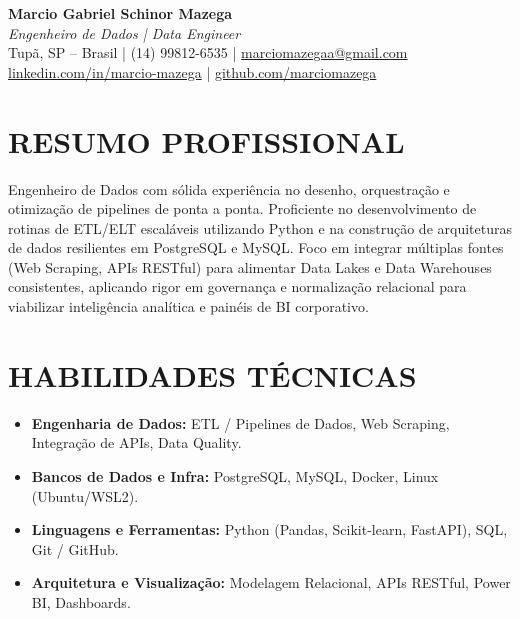 \documentclass[11pt,a4paper]{article}
\begin{document}
\pagestyle{empty}

{\centering
\textbf{\huge Marcio Gabriel Schinor Mazega} \\ \vspace{0.2cm}
\textit{\large Engenheiro de Dados | Data Engineer} \\ \vspace{0.1cm}
Tupã, SP -- Brasil | (14) 99812-6535 | \href{mailto:marciomazegaa@gmail.com}{marciomazegaa@gmail.com} \\
\href{https://linkedin.com/in/marcio-mazega}{linkedin.com/in/marcio-mazega} | \href{https://github.com/marciomazega}{github.com/marciomazega} \\
}

\vspace{0.4cm}
\section*{RESUMO PROFISSIONAL}
Engenheiro de Dados com sólida experiência no desenho, orquestração e otimização de pipelines de ponta a ponta. Proficiente no desenvolvimento de rotinas de ETL/ELT escaláveis utilizando Python e na construção de arquiteturas de dados resilientes em PostgreSQL e MySQL. Foco em integrar múltiplas fontes (Web Scraping, APIs RESTful) para alimentar Data Lakes e Data Warehouses consistentes, aplicando rigor em governança e normalização relacional para viabilizar inteligência analítica e painéis de BI corporativo.

\vspace{0.2cm}
\section*{HABILIDADES TÉCNICAS}
\begin{itemize}
    \item \textbf{Engenharia de Dados:} ETL / Pipelines de Dados, Web Scraping, Integração de APIs, Data Quality.
    \item \textbf{Bancos de Dados e Infra:} PostgreSQL, MySQL, Docker, Linux (Ubuntu/WSL2).
    \item \textbf{Linguagens e Ferramentas:} Python (Pandas, Scikit-learn, FastAPI), SQL, Git / GitHub.
    \item \textbf{Arquitetura e Visualização:} Modelagem Relacional, APIs RESTful, Power BI, Dashboards.
\end{itemize}

\vspace{0.2cm}
\end{document}

